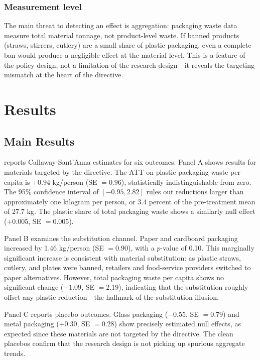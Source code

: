 \documentclass[12pt]{article}
\begin{document}
\subsubsection*{Measurement level} The main threat to detecting an effect is aggregation: packaging waste data measure total material tonnage, not product-level waste. If banned products (straws, stirrers, cutlery) are a small share of plastic packaging, even a complete ban would produce a negligible effect at the material level. This is a feature of the policy design, not a limitation of the research design---it reveals the targeting mismatch at the heart of the directive.


\section{Results}
\label{sec:results}

\subsection{Main Results}

 reports Callaway-Sant'Anna estimates for six outcomes. Panel A shows results for materials targeted by the directive. The ATT on plastic packaging waste per capita is $+0.94$ kg/person (SE $= 0.96$), statistically indistinguishable from zero. The 95\% confidence interval of $[-0.95, 2.82]$ rules out reductions larger than approximately one kilogram per person, or 3.4 percent of the pre-treatment mean of 27.7 kg. The plastic share of total packaging waste shows a similarly null effect ($+0.005$, SE $= 0.005$).

Panel B examines the substitution channel. Paper and cardboard packaging increased by 1.46 kg/person (SE $= 0.90$), with a $p$-value of 0.10. This marginally significant increase is consistent with material substitution: as plastic straws, cutlery, and plates were banned, retailers and food-service providers switched to paper alternatives. However, total packaging waste per capita shows no significant change ($+1.09$, SE $= 2.19$), indicating that the substitution roughly offset any plastic reduction---the hallmark of the substitution illusion.

Panel C reports placebo outcomes. Glass packaging ($-0.55$, SE $= 0.79$) and metal packaging ($+0.30$, SE $= 0.28$) show precisely estimated null effects, as expected since these materials are not targeted by the directive. The clean placebos confirm that the research design is not picking up spurious aggregate trends.
\end{document}

